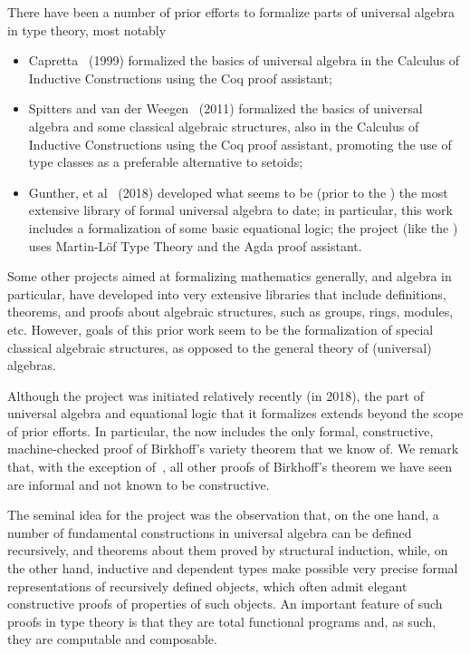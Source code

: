 \documentclass[a4paper,UKenglish,cleveref,autoref,thm-restate]{lipics-v2021}
\begin{document}
There have been a number of prior efforts to formalize parts of universal algebra in type theory, most notably
\begin{itemize}
  \item Capretta~\cite{Capretta:1999} (1999) formalized the basics of universal algebra in the Calculus of Inductive Constructions using the Coq proof assistant;
    \item Spitters and van der Weegen~\cite{Spitters:2011} (2011) formalized the basics of universal algebra and some classical algebraic structures, also in the Calculus of Inductive Constructions using the Coq proof assistant, promoting the use of type classes as a preferable alternative to setoids;
 \item Gunther, et al~\cite{Gunther:2018} (2018) developed what seems to be (prior to the \ualib) the most extensive library of formal universal algebra to date; in particular, this work includes a formalization of some basic equational logic; the project (like the \ualib) uses Martin-L\"of Type Theory and the Agda proof assistant.
\end{itemize}
Some other projects aimed at formalizing mathematics generally, and algebra in particular, have developed into very extensive libraries that include definitions, theorems, and proofs about algebraic structures, such as groups, rings, modules, etc.  However, goals of this prior work seem to be the formalization of special classical algebraic structures, as opposed to the general theory of (universal) algebras.

Although the \agdaualib project was initiated relatively recently (in 2018), the part of universal algebra and equational logic that it formalizes extends beyond the scope of prior efforts.  In particular, the \ualib now includes the only formal, constructive, machine-checked proof of Birkhoff's variety theorem that we know of. We remark that, with the exception of~\cite{Carlstrom:2008}, all other proofs of Birkhoff's theorem we have seen are informal and not known to be constructive.

The seminal idea for the \agdaualib project was the observation that, on the one hand, a number of fundamental constructions in universal algebra can be defined recursively, and theorems about them proved by structural induction, while, on the other hand, inductive and dependent types make possible very precise formal representations of recursively defined objects, which often admit elegant constructive proofs of properties of such objects.  An important feature of such proofs in type theory is that they are total functional programs and, as such, they are computable and composable.
\end{document}
